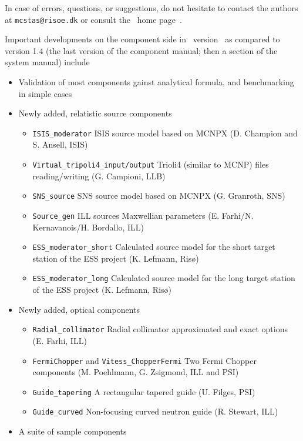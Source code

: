 In case of errors, questions, or suggestions,
do not hesitate to
contact the authors at \verb+mcstas@risoe.dk+
or consult the \MCS\ home page~\cite{mcstas_webpage}.

Important developments on the component side in \MCS\ version \version\
as compared to version 1.4 (the last version of the component manual;
then a section of the system manual) include

\begin{itemize}
\item{Validation of most components gainst analytical formula, 
and benchmarking in simple cases}
\item{Newly added, relatistic source components}
  \begin{itemize}
  \item \verb+ISIS_moderator+ ISIS source model based on MCNPX (D. Champion and S. Ansell, ISIS)
  \item \verb+Virtual_tripoli4_input/output+ Trioli4 (similar to MCNP) files reading/writing (G. Campioni, LLB)
  \item \verb+SNS_source+ SNS source model based on MCNPX (G. Granroth, SNS)
  \item \verb+Source_gen+ ILL sources Maxwellian parameters (E. Farhi/N. Kernavanois/H. Bordallo, ILL)
  \item \verb+ESS_moderator_short+ Calculated source model for the short target station of the ESS project (K. Lefmann, Ris\o )
  \item \verb+ESS_moderator_long+ Calculated source model for the long target station of the ESS project (K. Lefmann, Ris\o )
  \end{itemize}
\item{Newly added, optical components}
  \begin{itemize}
  \item \verb+Radial_collimator+ Radial collimator approximated and exact options (E. Farhi, ILL)
  \item \verb+FermiChopper+ and \verb+Vitess_ChopperFermi+ Two Fermi Chopper components (M. Poehlmann, G. Zsigmond, ILL and PSI)
  \item \verb+Guide_tapering+ A rectangular tapered guide (U. Filges, PSI)
  \item \verb+Guide_curved+  Non-focusing curved neutron guide (R. Stewart, ILL)
  \end{itemize}
\item{A suite of sample components}
  \begin{itemize}

\end{itemize}
\end{itemize}
